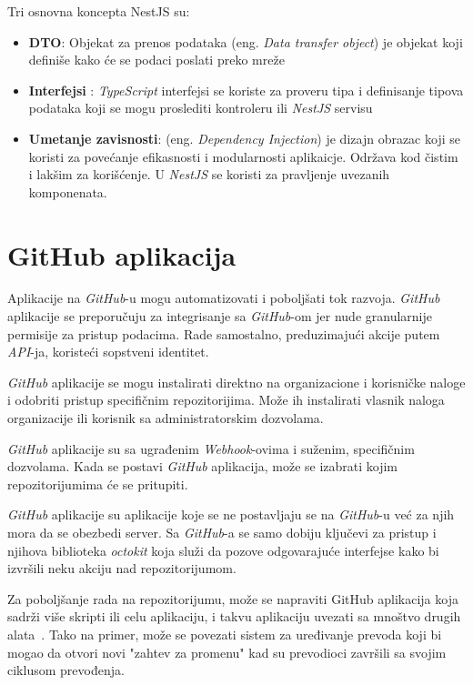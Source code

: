 Tri osnovna koncepta NestJS su:
\begin{itemize}
\item \textbf{DTO}: Objekat za prenos podataka (eng. \textit{Data transfer object}) je objekat 
koji definiše kako će se podaci poslati preko mreže
\item \textbf{Interfejsi} : \textit{TypeScript} interfejsi se koriste za proveru tipa i 
definisanje tipova podataka koji se mogu proslediti kontroleru ili \textit{NestJS} servisu
\item \textbf{Umetanje zavisnosti}: (eng. \textit{Dependency Injection}) je dizajn obrazac 
koji se koristi za povećanje efikasnosti i modularnosti aplikaicje. Održava kod čistim i 
lakšim za korišćenje. U \textit{NestJS} se koristi za pravljenje uvezanih komponenata.~\cite{nest_getting_started}
\end{itemize}

\section{GitHub aplikacija}\label{sec:github_app}
Aplikacije na \textit{GitHub}-u mogu automatizovati i poboljšati tok razvoja. \textit{GitHub} 
aplikacije se preporučuju za integrisanje sa \textit{GitHub}-om jer nude granularnije permisije 
za pristup podacima. Rade samostalno, preduzimajući akcije putem \textit{API}-ja, koristeći 
sopstveni identitet. 

\textit{GitHub} aplikacije se mogu instalirati direktno na organizacione i korisničke naloge i 
odobriti pristup specifičnim repozitorijima. Može ih instalirati vlasnik naloga organizacije 
ili korisnik sa administratorskim dozvolama. 

\textit{GitHub} aplikacije su sa ugrađenim \textit{Webhook}-ovima i suženim, specifičnim dozvolama. 
Kada se postavi \textit{GitHub} aplikacija, može se izabrati kojim repozitorijumima će se pritupiti.

\textit{GitHub} aplikacije su aplikacije koje se ne postavljaju se na \textit{GitHub}-u već za 
njih mora da se obezbedi server. Sa \textit{GitHub}-a se samo dobiju ključevi za pristup i njihova
biblioteka \textit{octokit} koja služi da pozove odgovarajuće interfejse kako bi izvršili neku 
akciju nad repozitorijumom.

Za poboljšanje rada na repozitorijumu, može se napraviti GitHub aplikacija koja sadrži više skripti 
ili celu aplikaciju, i takvu aplikaciju uvezati sa mnoštvo drugih alata~\cite{github_apps}. Tako na 
primer, može se povezati sistem za uređivanje prevoda koji bi mogao da otvori novi "zahtev za promenu"
kad su prevodioci završili sa svojim ciklusom prevođenja.

